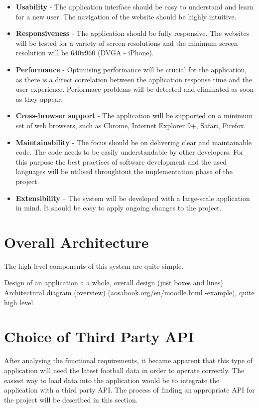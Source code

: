 \begin{itemize}
	\item \textbf{Usability} - The application interface should be easy to understand and learn for a new user. The navigation of the website should be highly intuitive.
	\item \textbf{Responsiveness} - The application should be fully responsive. The websites will be tested for a variety of screen resolutions and the minimum screen resolution will be 640x960 (DVGA - iPhone).
	\item \textbf{Performance} - Optimising performance will be crucial for the application, as there is a direct correlation between the application response time and the user experience.  Performace problems will be detected and eliminated as soon as they appear. 
	\item \textbf{Cross-browser support} - The application will be supported on a minimum set of web browsers, such as Chrome, Internet Explorer 9+, Safari, Firefox.
	\item \textbf{Maintainability} - The focus should be on delivering clear and maintainable code. The code needs to be easily understandable by other developers. For this purpose the best practices of software development and the used languages will be utilised throughtout the implementation phase of the project.
	\item \textbf{Extensibility} – The system will be developed with a large-scale application in mind. It should be easy to apply ongoing changes to the project.
\end{itemize}

\section{Overall Architecture}
\label{overallarchitecture_req}
The high level components of this system are quite simple. 

Design of an application a a whole, overall design (just boxes and lines)
Architectural diagram (overview) (aosabook.org/en/moodle.html -example), quite high level


\section{Choice of Third Party API}
\label{sec:thirdpartyapi_req}
	
After analysing the functional requirements, it became apparent that this type of application will need the latest football data in order to operate correctly. The easiest way to load data into the application would be to integrate the application with a third party API. The process of finding an appropriate API for the project will be described in this section. 
	
